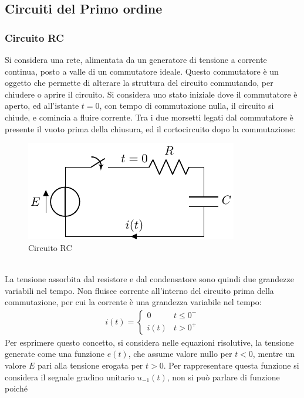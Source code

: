 \documentclass{article}
\numberwithin{equation}{subsection}
\begin{document}
\subsection{Circuiti del Primo ordine}

\subsubsection{Circuito RC}

Si considera una rete, alimentata da un generatore di tensione a corrente continua, posto a valle di un commutatore ideale. Questo commutatore è un oggetto che permette 
di alterare la struttura del circuito commutando, per chiudere o aprire il circuito. Si considera uno stato iniziale dove il commutatore è aperto, ed all'istante $t=0$, 
con tempo di commutazione nulla, il circuito si chiude, e comincia a fluire corrente. Tra i due morsetti legati dal commutatore è presente il vuoto prima della chiusura, ed 
il cortocircuito dopo la commutazione: 
\begin{figure}[ht]%
    \centering
    \includegraphics{circuito-rc-tempo-continuo.pdf}
    \caption{Circuito RC}
    \label{fig:circuito-rc}
\end{figure}
\\
La tensione assorbita dal resistore e dal condensatore sono quindi due grandezze variabili nel tempo. Non fluisce corrente all'interno del circuito prima della 
commutazione, per cui la corrente è una grandezza variabile nel tempo:
\begin{gather*}
    i(t)=\begin{cases}
        0&t\leq0^-\\
        i(t)&t>0^+
    \end{cases}
\end{gather*}
Per esprimere questo concetto, si considera nelle equazioni risolutive, la tensione generate come una funzione $e(t)$, che assume valore nullo per $t<0$, mentre un valore 
$E$ pari alla tensione erogata per $t>0$. Per rappresentare questa funzione si considera il segnale gradino unitario $u_{-1}(t)$, non si può parlare di funzione poiché 
\end{document}
